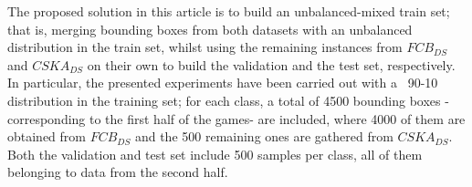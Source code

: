 \documentclass{article}
\begin{document}
The proposed solution in this article %
is to build an unbalanced-mixed train set; that is, merging bounding boxes from both datasets with an unbalanced distribution in the train set, whilst using the remaining instances from $FCB_{DS}$ and $CSKA_{DS}$ on their own to build the validation and the test set, respectively. In particular, the presented experiments have been carried out with a ~90-10 distribution in the training set; for each class, a total of 4500 bounding boxes -corresponding to the first half of the games- are included, where 4000 of them are obtained from $FCB_{DS}$ and the 500 remaining ones are gathered from $CSKA_{DS}$. Both the validation and test set include 500 samples per class, all of them belonging to data from the second half. 
\end{document}
